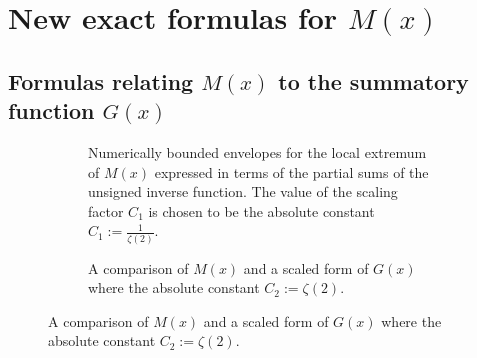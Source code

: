 \documentclass[11pt,reqno,a4letter]{article}
\numberwithin{equation}{section}
\numberwithin{figure}{section}
\numberwithin{table}{section}
\theoremstyle{plain}
\numberwithin{theorem}{section}
\theoremstyle{definition}
\begin{document}
\section{New exact formulas for $M(x)$} 
\label{Section_KeyApplications} 

\subsection{Formulas relating $M(x)$ to the summatory function $G(x)$} 
\label{subSection_KeyApplications_NewExactFormulasForMx} 

\begin{figure}[ht!]

\captionsetup{singlelinecheck=off}
\centering

\begin{subfigure}[t]{0.85\textwidth}
\caption{Numerically bounded envelopes for the local extremum of $M(x)$ expressed in terms of the partial sums of the unsigned 
         inverse function. The value of the scaling factor $C_1$ is chosen to be the 
         absolute constant $C_1 := \frac{1}{\zeta(2)}$. }
\end{subfigure}

\medskip

\begin{subfigure}[t]{0.85\textwidth}
\caption{A comparison of $M(x)$ and a scaled form of $G(x)$ where 
         the absolute constant $C_2 := \zeta(2)$. } 
\end{subfigure}


\end{figure}
\end{document}
